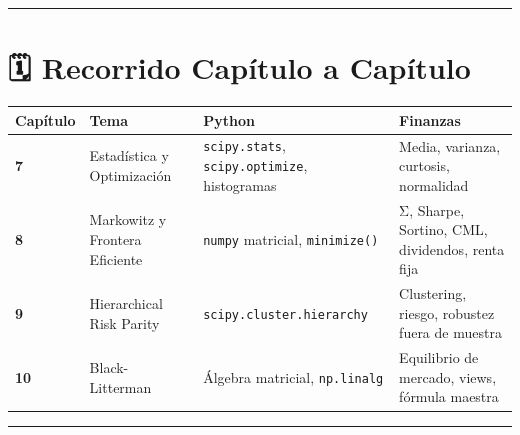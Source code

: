 \documentclass[
  spanish,
  letterpaper,
  DIV=11,
  numbers=noendperiod]{scrreprt}
\begin{document}
\begin{center}\rule{0.5\linewidth}{0.5pt}\end{center}

\section*{🗓️ Recorrido Capítulo a
Capítulo}\label{recorrido-capuxedtulo-a-capuxedtulo-1}


\begin{longtable}[]{@{}
  >{\centering\arraybackslash}p{}
  >{\raggedright\arraybackslash}p{}
  >{\raggedright\arraybackslash}p{}
  >{\raggedright\arraybackslash}p{}@{}}
\toprule\noalign{}
\begin{minipage}[b]{\linewidth}\centering
Capítulo
\end{minipage} & \begin{minipage}[b]{\linewidth}\raggedright
Tema
\end{minipage} & \begin{minipage}[b]{\linewidth}\raggedright
Python
\end{minipage} & \begin{minipage}[b]{\linewidth}\raggedright
Finanzas
\end{minipage} \\
\midrule\noalign{}
\endhead
\bottomrule\noalign{}
\endlastfoot
\textbf{7} & Estadística y Optimización & \texttt{scipy.stats},
\texttt{scipy.optimize}, histogramas & Media, varianza, curtosis,
normalidad \\
\textbf{8} & Markowitz y Frontera Eficiente & \texttt{numpy} matricial,
\texttt{minimize()} & Σ, Sharpe, Sortino, CML, dividendos, renta fija \\
\textbf{9} & Hierarchical Risk Parity & \texttt{scipy.cluster.hierarchy}
& Clustering, riesgo, robustez fuera de muestra \\
\textbf{10} & Black-Litterman & Álgebra matricial, \texttt{np.linalg} &
Equilibrio de mercado, views, fórmula maestra \\
\end{longtable}

\begin{center}\rule{0.5\linewidth}{0.5pt}\end{center}
\end{document}
